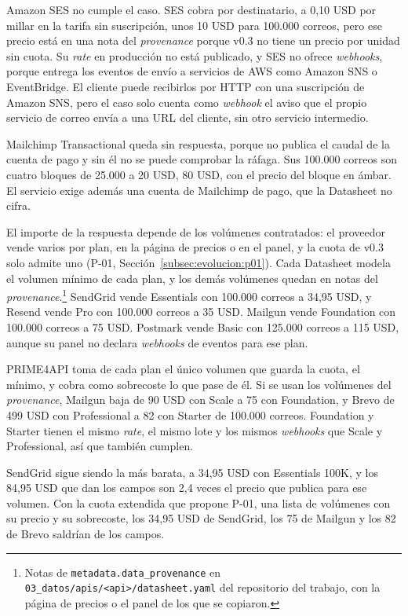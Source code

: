 Amazon SES no cumple el caso.
SES cobra por destinatario, a 0,10 USD por millar en la tarifa sin suscripción, unos 10 USD para 100.000 correos, pero ese precio está en una nota del \textit{provenance} porque v0.3 no tiene un precio por unidad sin cuota.
Su \textit{rate} en producción no está publicado, y SES no ofrece \textit{webhooks}, porque entrega los eventos de envío a servicios de AWS como Amazon SNS o EventBridge.
El cliente puede recibirlos por HTTP con una suscripción de Amazon SNS, pero el caso solo cuenta como \textit{webhook} el aviso que el propio servicio de correo envía a una URL del cliente, sin otro servicio intermedio.

Mailchimp Transactional queda sin respuesta, porque no publica el caudal de la cuenta de pago y sin él no se puede comprobar la ráfaga.
Sus 100.000 correos son cuatro bloques de 25.000 a 20 USD, 80 USD, con el precio del bloque en ámbar.
El servicio exige además una cuenta de Mailchimp de pago, que la Datasheet no cifra.

El importe de la respuesta depende de los volúmenes contratados: el proveedor vende varios por plan, en la página de precios o en el panel, y la cuota de v0.3 solo admite uno (P-01, Sección~\ref{subsec:evolucion:p01}).
Cada Datasheet modela el volumen mínimo de cada plan, y los demás volúmenes quedan en notas del \textit{provenance}.\footnote{Notas de \texttt{metadata.data\_provenance} en \texttt{03\_datos/apis/<api>/datasheet.yaml} del repositorio del trabajo, con la página de precios o el panel de los que se copiaron.}
SendGrid vende Essentials con 100.000 correos a 34,95 USD, y Resend vende Pro con 100.000 correos a 35 USD.
Mailgun vende Foundation con 100.000 correos a 75 USD.
Postmark vende Basic con 125.000 correos a 115 USD, aunque su panel no declara \textit{webhooks} de eventos para ese plan.

PRIME4API toma de cada plan el único volumen que guarda la cuota, el mínimo, y cobra como sobrecoste lo que pase de él.
Si se usan los volúmenes del \textit{provenance}, Mailgun baja de 90 USD con Scale a 75 con Foundation, y Brevo de 499 USD con Professional a 82 con Starter de 100.000 correos.
Foundation y Starter tienen el mismo \textit{rate}, el mismo lote y los mismos \textit{webhooks} que Scale y Professional, así que también cumplen.

SendGrid sigue siendo la más barata, a 34,95 USD con Essentials 100K, y los 84,95 USD que dan los campos son 2,4 veces el precio que publica para ese volumen.
Con la cuota extendida que propone P-01, una lista de volúmenes con su precio y su sobrecoste, los 34,95 USD de SendGrid, los 75 de Mailgun y los 82 de Brevo saldrían de los campos.

